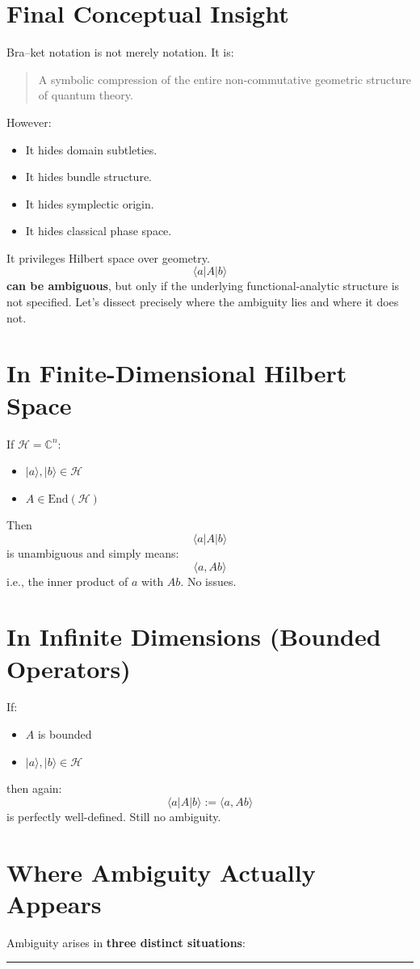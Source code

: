 \documentclass[12pt]{article}
\begin{document}
\section{Final Conceptual Insight}\label{final-conceptual-insight}
Bra--ket notation is not merely notation.
It is:
\begin{quote}
A symbolic compression of the entire non-commutative geometric structure
of quantum theory.
\end{quote}
However:
\begin{itemize}
\item
  It hides domain subtleties.
\item
  It hides bundle structure.
\item
  It hides symplectic origin.
\item
  It hides classical phase space.
\end{itemize}
It privileges Hilbert space over geometry.
\[\langle a|A|b\rangle\]
\textbf{can be ambiguous}, but only if the underlying
functional-analytic structure is not specified.
Let's dissect precisely where the ambiguity lies and where it does not.
\section{ In Finite-Dimensional Hilbert
Space}\label{in-finite-dimensional-hilbert-space}
If \(\mathcal H = \mathbb C^n\):
\begin{itemize}
\item
  \(|a\rangle, |b\rangle \in \mathcal H\)
\item
  \(A \in \mathrm{End}(\mathcal H)\)
\end{itemize}
Then
\[\langle a|A|b\rangle\]
is unambiguous and simply means:
\[\langle a, A b \rangle\]
i.e., the inner product of \(a\) with \(Ab\).
No issues.
\section{ In Infinite Dimensions (Bounded
Operators)}\label{in-infinite-dimensions-bounded-operators}
If:
\begin{itemize}
\item
  \(A\) is bounded
\item
  \( |a\rangle, |b\rangle \in \mathcal H\)
\end{itemize}
then again:
\[\langle a|A|b\rangle := \langle a, A b\rangle\]
is perfectly well-defined.
Still no ambiguity.
\section{ Where Ambiguity Actually
Appears}\label{where-ambiguity-actually-appears}
Ambiguity arises in \textbf{three distinct situations}:
\begin{center}\rule{0.5\linewidth}{0.5pt}\end{center}
\end{document}
